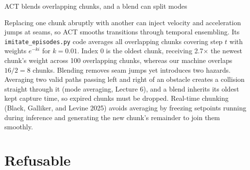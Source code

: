 \documentclass[aspectratio=169, 12pt]{beamer}
\begin{document}
\begin{frame}{ACT blends overlapping chunks, and a blend can split modes}
{  Replacing one chunk abruptly with another can inject velocity and acceleration jumps at seams, so ACT smooths transitions through temporal ensembling. Its \texttt{imitate\_episodes.py} code averages all overlapping chunks covering step $t$ with weights $e^{-k i}$ for $k = 0.01$. Index 0 is the oldest chunk, receiving 2.7$\times$ the newest chunk's weight across 100 overlapping chunks, whereas our machine overlaps $16 / 2 = 8$ chunks. Blending removes seam jumps yet introduces two hazards. Averaging two valid paths passing left and right of an obstacle creates a collision straight through it (mode averaging, Lecture 6), and a blend inherits its oldest kept capture time, so expired chunks must be dropped. Real-time chunking (Black, Galliker, and Levine 2025) avoids averaging by freezing setpoints running during inference and generating the new chunk's remainder to join them smoothly.


}
\end{frame}

\section{Refusable}
\end{document}
